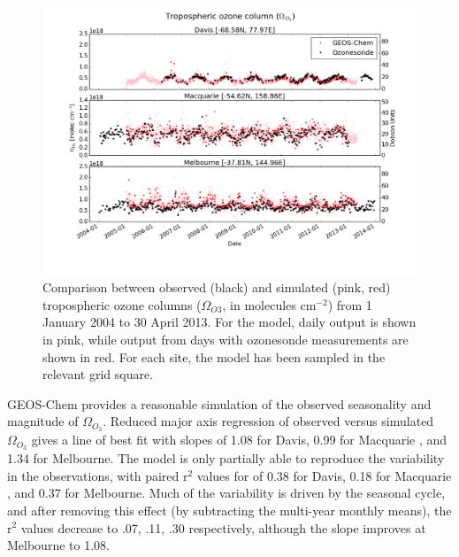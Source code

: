 \documentclass[acp, manuscript]{copernicus} %
\providecommand{\DIFadd}[1]{{\protect\color{blue}\uwave{#1}}} %
\providecommand{\DIFaddbegin}{} %
\providecommand{\DIFaddend}{} %
\providecommand{\DIFdelbegin}{} %
\providecommand{\DIFdelend}{} %
\providecommand{\DIFaddbeginFL}{} %
\providecommand{\DIFaddendFL}{} %
\providecommand{\DIFdelbeginFL}{} %
\providecommand{\DIFdelendFL}{} %
\begin{document}
  \DIFdelbegin %
\DIFdelend \DIFaddbegin \begin{figure}
    \DIFaddendFL %
    \includegraphics[width=12.0cm]{figures/StationSeries.png}
    \caption{Comparison between observed (black) and simulated (pink, red) tropospheric ozone columns ($\Omega_{O3}$, in molecules cm$^{-2}$) from 1 January 2004 to 30 April 2013.
    For the model, daily output is shown in pink, while output from days with ozonesonde measurements are shown in red.
    For each site, the model has been sampled in the relevant grid square.}
    \label{fig:StationSeriesGEOSChem}
  \DIFdelbeginFL %
\DIFdelendFL \DIFaddbeginFL \end{figure}
  \DIFaddend 

  GEOS-Chem provides a reasonable simulation of the observed seasonality and magnitude of $\Omega_{O_3}$.
  Reduced major axis regression of observed versus simulated $\Omega_{O_3}$ gives a line of best fit with slopes of 1.08 for Davis, 0.99 for Macquarie \DIFaddbegin \DIFadd{Island}\DIFaddend , and 1.34 for Melbourne.
  The model is only partially able to reproduce the variability in the observations, with paired r$^2$ values for of 0.38 for Davis, 0.18 for Macquarie \DIFaddbegin \DIFadd{Island}\DIFaddend , and 0.37 for Melbourne.
  Much of the variability is driven by the seasonal cycle, and after removing this effect (by subtracting the multi-year monthly means), the r$^2$ values decrease to .07, .11, .30 respectively, although the slope improves at Melbourne to 1.08.
\end{document}
